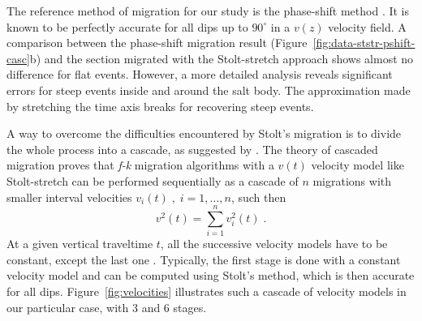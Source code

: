 \par
The reference method of migration for our study is the phase-shift
method \cite{GEO43.07.13421351}. It is known to be perfectly accurate
for all dips up to $90^\circ$ in a $v(z)$ velocity field. A comparison
between the phase-shift migration result
(Figure~\ref{fig:data-ststr-pshift-casc}b) and the section migrated
with the Stolt-stretch approach shows almost no difference for flat
events. However, a more detailed analysis reveals significant errors
for steep events inside and around the salt body. The approximation
made by stretching the time axis breaks for recovering steep events.
\par
A way to overcome the difficulties encountered by Stolt's migration is
to divide the whole process into a cascade, as suggested by
. The theory of cascaded migration proves
that {\it f-k} migration algorithms with a $v(t)$ velocity model like
Stolt-stretch can be performed sequentially as a cascade of $n$
migrations with smaller interval velocities $v_i(t) \; , \;
i=1,\ldots,n$, such then
\begin{equation}
\label{eqn:larner}
v^2(t) = \sum_{i=1}^{n} v_i^2(t)\;.
\end{equation}
At a given vertical traveltime $t$, all the successive velocity models
have to be constant, except the last one \cite{GEO52.05.06180643}.
Typically, the first stage is done with a constant velocity model and
can be computed using Stolt's method, which is then accurate for all
dips. Figure~\ref{fig:velocities} illustrates such a cascade of
velocity models in our particular case, with 3 and 6 stages.

